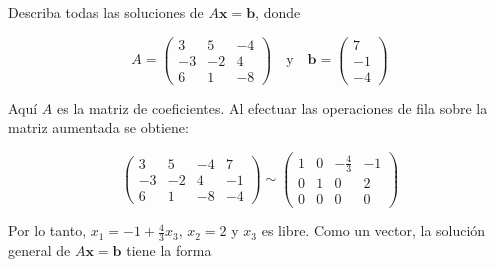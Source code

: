 \documentclass{article}
\begin{document}
Describa todas las soluciones de $A\mathbf{x} = \mathbf{b}$, donde 

\begin{equation*}
    A = \left(\begin{array}{rrr}
        3 & 5 & -4\\
        -3 & -2 & 4\\
        6 & 1 & -8
    \end{array}\right)
    \quad \text{y} \quad
    \mathbf{b}= \left(\begin{array}{rrr}
        7\\-1\\-4
    \end{array}\right)
\end{equation*}

Aquí $A$ es la matriz de coeficientes. Al efectuar las operaciones de fila sobre la matriz aumentada se obtiene:

\begin{equation*}
    \left(\begin{array}{rrr|r}
        3 & 5 & -4 & 7 \\
        -3 & -2 & 4 & -1 \\
        6 & 1 & -8 & -4
    \end{array}\right) \sim
    \left(\begin{array}{rrr|r}
        1 & 0 & -\frac{4}{3} & -1 \\
        0 & 1 & 0 & 2 \\
        0 & 0 & 0 & 0
    \end{array}\right)
\end{equation*}

Por lo tanto, $x_1= -1 + \frac{4}{3}x_3$, $x_2=2$ y $x_3$ es libre. Como un vector, la solución general de $A\mathbf{x} = \mathbf{b}$ tiene la forma
\end{document}
